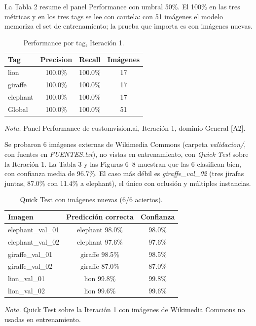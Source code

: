 \documentclass[a4paper,12pt]{article}
\begin{document}
  La Tabla 2 resume el panel Performance con umbral 50\%. El 100\% en las tres m\'etricas y en los tres tags se lee con cautela: con 51 im\'agenes el modelo memoriza el set de entrenamiento; la prueba que importa es con im\'agenes nuevas.

  \begin{table}[H]
    \caption{Performance por tag, Iteraci\'on 1.}
    \label{tab:performance}
    \begin{tabular}{@{}lccc@{}}
      \toprule
      Tag & Precision & Recall & Im\'agenes \\
      \midrule
      lion & 100.0\% & 100.0\% & 17 \\
      giraffe & 100.0\% & 100.0\% & 17 \\
      elephant & 100.0\% & 100.0\% & 17 \\
      \midrule
      Global & 100.0\% & 100.0\% & 51 \\
      \bottomrule
    \end{tabular}
    \par\medskip
    \begin{minipage}{\linewidth}
      \footnotesize\textit{Nota.} Panel Performance de customvision.ai, Iteraci\'on 1, dominio General [A2].
    \end{minipage}
  \end{table}

  Se probaron 6 im\'agenes externas de Wikimedia Commons (carpeta \textit{validacion/}, con fuentes en \textit{FUENTES.txt}), no vistas en entrenamiento, con \textit{Quick Test} sobre la Iteraci\'on 1. La Tabla 3 y las Figuras 6--8 muestran que las 6 clasifican bien, con confianza media de 96.7\%. El caso m\'as d\'ebil es \textit{giraffe\_val\_02} (tres jirafas juntas, 87.0\% con 11.4\% a elephant), el \'unico con oclusi\'on y m\'ultiples instancias.

  \begin{table}[H]
    \caption{Quick Test con im\'agenes nuevas (6/6 aciertos).}
    \label{tab:quicktest}
    \begin{tabular}{@{}lcc@{}}
      \toprule
      Imagen & Predicci\'on correcta & Confianza \\
      \midrule
      elephant\_val\_01 & elephant 98.0\% & 98.0\% \\
      elephant\_val\_02 & elephant 97.6\% & 97.6\% \\
      giraffe\_val\_01 & giraffe 98.5\% & 98.5\% \\
      giraffe\_val\_02 & giraffe 87.0\% & 87.0\% \\
      lion\_val\_01 & lion 99.8\% & 99.8\% \\
      lion\_val\_02 & lion 99.6\% & 99.6\% \\
      \bottomrule
    \end{tabular}
    \par\medskip
    \begin{minipage}{\linewidth}
      \footnotesize\textit{Nota.} Quick Test sobre la Iteraci\'on 1 con im\'agenes de Wikimedia Commons no usadas en entrenamiento.
    \end{minipage}
  \end{table}
\end{document}
